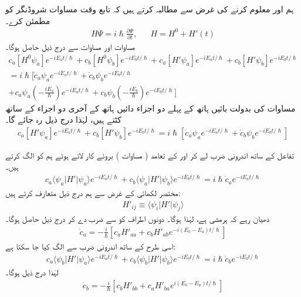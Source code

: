 ہم  اور  معلوم کرنے کی غرض سے مطالبہ کرتے ہیں کہ  تابع وقت مساوات شروڈنگر کو مطمئن کرے۔
\begin{align}\label{مساوات_تابع_مضطرب_مطمئن}
	H\Psi=i\hslash\frac{\partial\Psi}{\partial t},&&H=H^0+H'(t)
\end{align}
مساوات  اور مساوات  سے درج ذیل حاصل ہوگا۔
\begin{multline*}
	c_a[H^0\psi_a]e^{-iE_at/\hslash}+c_b[H^0\psi_b]e^{-iE_bt/\hslash}+c_a[H'\psi_a]e^{-iE_at/\hslash}+c_b[H'\psi_b]e^{-iE_bt/\hslash} \\
	=i\hslash\Big[\dot{c}_a\psi_ae^{-iE_at/\hslash}+\dot{c}_b\psi_be^{-iE_bt/\hslash}\\
	+c_a\psi_a\left(-\frac{iE_a}{\hslash}\right)e^{-iE_at/\hslash}+c_b\psi_b\left(-\frac{iE_b}{\hslash}\right)e^{-iE_bt/\hslash}\Big]
\end{multline*}
مساوات  کی بدولت بائیں ہاتھ کے پہلے دو اجزاء دائیں ہاتھ کے آخری دو اجزاء کے ساتھ کٹتے ہیں، لہٰذا درج ذیل رہ جائے گا۔
\begin{align}
	c_a[H'\psi_a]e^{-iE_at/\hslash}+c_b[H'\psi_b]e^{-iE_bt/\hslash}=i\hslash\left[\dot{c}_a\psi_ae^{-iE_at/\hslash}+\dot{c}_b\psi_be^{-iE_bt/\hslash}\right]
\end{align}

تفاعل  کے ساتھ اندرونی ضرب لے کر  اور  کے تعامد  ( مساوات ) بروئے کار لاتے ہوئے ہم  کو الگ کرتے ہیں۔
\begin{align*}
	c_a\langle\psi_a| H'|\psi_a\rangle e^{-iE_at/\hslash}+c_b\langle\psi_a| H'|\psi_b\rangle e^{-iE_bt/\hslash}=i\hslash\dot{c}_ae^{-iE_at/\hslash}
\end{align*}
مختصر لکھائی کے غرض سے ہم درج ذیل متعارف کرتے ہیں:
\begin{align}
	H'_{ij}\equiv\langle\psi_i| H'|\psi_j\rangle
\end{align}
دھیان رہے کہ  ہرمشی ہے، لہٰذا  ہوگا۔ دونوں اطراف کو  سے ضرب دے کر درج ذیل حاصل ہوگا۔
\begin{align}\label{مساوات_تابع_مضطرب_تحویلی_شرح_الف}
	\dot{c}_a=-\frac{i}{\hslash}\left[c_aH'_{aa}+c_bH'_{ab}e^{-i(E_b-E_a)t/\hslash}\right]
\end{align}
اسی طرح  کے ساتھ اندرونی ضرب سے  الگ کیا جا سکتا ہے:
\begin{align*}
	c_a\langle\psi_b| H'|\psi_a\rangle e^{-iE_at/\hslash}+c_b\langle\psi_b| H'|\psi_b\rangle e^{-iE_bt/\hslash}=i\hslash\dot{c}_be^{-iE_bt/\hslash}
\end{align*}
لہٰذا درج ذیل ہوگا۔
\begin{align}\label{مساوات_تابع_مضطرب_تحویلی_شرح_ب}
	\dot{c}_b=-\frac{i}{\hslash}\left[c_bH'_{bb}+c_aH'_{ba}e^{i(E_b-E_a)t/\hslash}\right]
\end{align}

